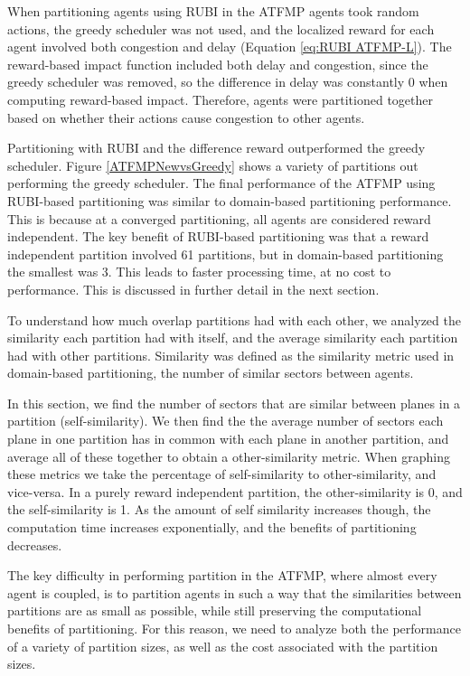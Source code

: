\documentclass[letterpaper]{article}
\begin{document}
When partitioning agents using RUBI in the ATFMP agents took random actions, the greedy scheduler was not used, and the localized reward for each agent involved both congestion and delay (Equation \ref{eq:RUBI ATFMP-L}). The reward-based impact function included both delay and congestion, since the greedy scheduler was removed, so the difference in delay was constantly 0 when computing reward-based impact. Therefore, agents were partitioned together based on whether their actions cause congestion to other agents. 

Partitioning with RUBI and the difference reward outperformed the greedy scheduler. Figure \ref{ATFMPNewvsGreedy} shows a variety of partitions out performing the greedy scheduler. The final performance of the ATFMP using RUBI-based partitioning was similar to domain-based partitioning performance. This is because at a converged partitioning, all agents are considered reward independent. The key benefit of RUBI-based partitioning was that a reward independent partition involved 61 partitions, but in domain-based partitioning the smallest was 3. This leads to faster processing time, at no cost to performance. This is discussed in further detail in the next section.

To understand how much overlap partitions had with each other, we analyzed the similarity each partition had with itself, and the average similarity each partition had with other partitions. Similarity was defined as the similarity metric used in domain-based partitioning, the number of similar sectors between agents.

In this section, we find the number of sectors that are similar between planes in a partition (self-similarity). We then find the the average number of sectors each plane in one partition has in common with each plane in another partition, and average all of these together to obtain a other-similarity metric. When graphing these metrics we take the percentage of self-similarity to other-similarity, and vice-versa. In a purely reward independent partition, the other-similarity is 0, and the self-similarity is 1. As the amount of self similarity increases though, the computation time increases exponentially, and the benefits of partitioning decreases.

The key difficulty in performing partition in the ATFMP, where almost every agent is coupled, is to partition agents in such a way that the similarities between partitions are as small as possible, while still preserving the computational benefits of partitioning. For this reason, we need to analyze both the performance of a variety of partition sizes, as well as the cost associated with the partition sizes.
\end{document}
